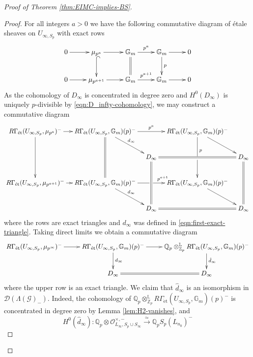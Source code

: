 \documentclass[12pt]{amsart}
\theoremstyle{plain}
\theoremstyle{remark}
\theoremstyle{definition}
\numberwithin{equation}{section}
\begin{document}
{\begin{proof}[Proof of Theorem \ref{thm:EIMC-implies-BS}]
\begin{proof}
For all integers $a>0$ we have the following commutative diagram of \'{e}tale sheaves on $U_{\infty,S_{p}}$ with exact rows
\[ 
\xymatrix{
{0} \ar[r] & {\mu_{p^{a}}} \ar[r] \ar@{^{(}->}[d] & \mathbb{G}_{m} \ar@{=}[d] \ar[r]^{p^{a}} & \mathbb{G}_{m} \ar[d]^{p} \ar[r] & 0\\
{0} \ar[r] & {\mu_{p^{a+1}}} \ar[r]  & \mathbb{G}_{m}  \ar[r]^{p^{a+1}} & \mathbb{G}_{m} \ar[r] & 0
}
\]
As the cohomology of $D_{\infty}$ is concentrated in degree zero and $H^0(D_{\infty})$ is uniquely $p$-divisible by \eqref{eqn:D_infty-cohomology},
we may construct a commutative diagram
\[
\xymatrixcolsep{.8pc}
\xymatrix{
{R\Gamma_{\mathrm{\acute{e}t}}(U_{\infty, S_{p}}, \mu_{p^{a}})^{-}} \ar[r] \ar[dd] &
R\Gamma_{\mathrm{\acute{e}t}}(U_{\infty, S_{p}}, \mathbb{G}_{m})(p)^{-} \ar[rr]^{p^{a}} \ar@{=}[dd] \ar[dr]^{d_{\infty}} & &
R\Gamma_{\mathrm{\acute{e}t}}(U_{\infty, S_{p}}, \mathbb{G}_{m})(p)^{-} \ar@{->}'[d]^(.75){p}[dd] \ar[dr] & \\
& & D_{\infty} \ar@{=}[rr] \ar@{=}[dd] & & D_{\infty} \ar@{=}[dd] \\
{R\Gamma_{\mathrm{\acute{e}t}}(U_{\infty, S_{p}}, \mu_{p^{a+1}})^{-}} \ar[r] &
R\Gamma_{\mathrm{\acute{e}t}}(U_{\infty, S_{p}}, \mathbb{G}_{m})(p)^{-} \ar@{->}'[r][rr]^(.25){p^{a+1}} \ar[dr]^{d_{\infty}} & &
R\Gamma_{\mathrm{\acute{e}t}}(U_{\infty, S_{p}}, \mathbb{G}_{m})(p)^{-} \ar[dr] & \\
& & D_{\infty} \ar@{=}[rr] & & D_{\infty}
}\]
where the rows are exact triangles and $d_{\infty}$ was defined in \eqref{eqn:first-exact-triangle}. 
Taking direct limits we obtain a commutative diagram
\[ \xymatrix{
{R\Gamma_{\mathrm{\acute{e}t}}(U_{\infty, S_{p}}, \mu_{p^{\infty}})^{-}} \ar[r] &
R\Gamma_{\mathrm{\acute{e}t}}(U_{\infty, S_{p}}, \mathbb{G}_{m})(p)^{-} \ar[r] \ar[d]^{d_{\infty}} &
{\mathbb{Q}}_{p} \otimes_{{\mathbb{Z}}_{p}}^{\mathbb{L}} R\Gamma_{\mathrm{\acute{e}t}}(U_{\infty, S_{p}}, \mathbb{G}_{m})(p)^{-} \ar[d]^{\hat{d}_{\infty}} \\
& D_{\infty} \ar@{=}[r] & D_{\infty}
}\]
where the upper row is an exact triangle. 
We claim that $\hat{d}_{\infty}$ is an isomorphism in $\mathcal{D}(\Lambda(\mathcal{G})_{-})$.
Indeed, the cohomology of ${\mathbb{Q}}_{p} \otimes_{{\mathbb{Z}}_{p}}^{\mathbb{L}} R\Gamma_{\mathrm{\acute{e}t}}(U_{\infty, S_{p}}, \mathbb{G}_{m})(p)^{-}$
is concentrated in degree zero by Lemma \ref{lem:H2-vanishes}, and
\[
H^0(\hat{d}_{\infty}): {\mathbb{Q}}_{p} \otimes \mathcal{O}_{L_{\infty}, S_{p} \cup S_{\infty}}^{\times,-}
\stackrel{\simeq}{\longrightarrow} {\mathbb{Q}}_{p} S_{p}(L_{n_{0}})^{-}
\]
\end{proof}
\end{proof}}
\end{document}
